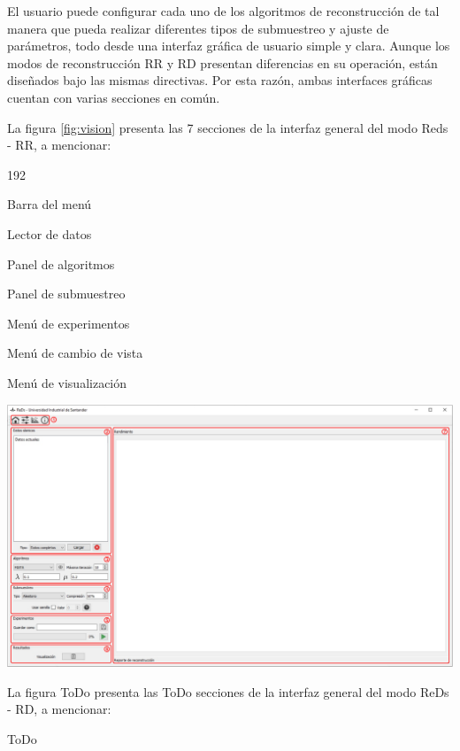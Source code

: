 \documentclass[12pt,twoside,letter]{ol-softwaremanual}
\newenvironment{Figure}
  {\par\medskip\noindent\minipage{\linewidth}}
  {\endminipage\par\medskip}
\begin{document}
El usuario puede configurar cada uno de los algoritmos de reconstrucción de tal manera que pueda realizar diferentes tipos de submuestreo y ajuste de parámetros, todo desde una interfaz gráfica de usuario simple y clara. Aunque los modos de reconstrucción RR y RD presentan diferencias en su operación, están diseñados bajo las mismas directivas. Por esta razón, ambas interfaces gráficas cuentan con varias secciones en común.

La figura \ref{fig:vision} presenta las 7 secciones de la interfaz general del modo Reds - RR, a mencionar:
\begin{dingautolist}{192}
	\setlength\itemsep{0em}
	\item Barra del menú
	\item Lector de datos
	\item Panel de algoritmos
	\item Panel de submuestreo
	\item Menú de experimentos
	\item Menú de cambio de vista
	\item Menú de visualización
\end{dingautolist}

\begin{Figure}
    \centering
    \includegraphics[width=1\linewidth]{figures/vision_v2}
    \label{fig:vision}
\end{Figure}

{\color{red}La figura ToDo presenta las ToDo secciones de la interfaz general del modo ReDs - RD, a mencionar:

ToDo}
\end{document}
